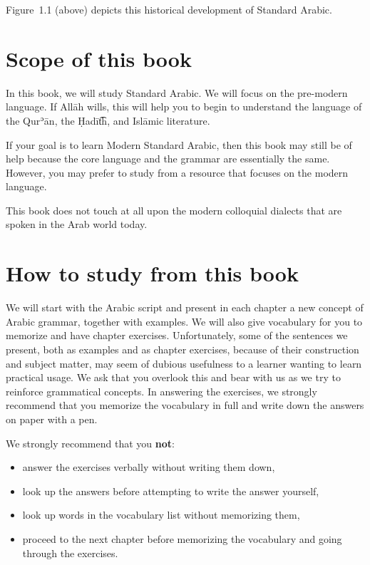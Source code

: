 \documentclass[
  10pt,
]{book}
\providecommand{\tightlist}{%
  \setlength{\itemsep}{0pt}\setlength{\parskip}{0pt}}
\begin{document}
Figure~1.1 (above) depicts this historical development of Standard Arabic.

\section{Scope of this book}\label{scope-of-this-book}

In this book, we will study Standard Arabic. We will focus on the pre-modern language. If Allāh wills, this will help you to begin to understand the language of the Qurʾān, the Ḥadīt͡h, and Islāmic literature.

If your goal is to learn Modern Standard Arabic, then this book may still be of help because the core language and the grammar are essentially the same. However, you may prefer to study from a resource that focuses on the modern language.

This book does not touch at all upon the modern colloquial dialects that are spoken in the Arab world today.

\section{How to study from this book}\label{how-to-study-from-this-book}

We will start with the Arabic script and present in each chapter a new concept of Arabic grammar, together with examples. We will also give vocabulary for you to memorize and have chapter exercises. Unfortunately, some of the sentences we present, both as examples and as chapter exercises, because of their construction and subject matter, may seem of dubious usefulness to a learner wanting to learn practical usage. We ask that you overlook this and bear with us as we try to reinforce grammatical concepts. In answering the exercises, we strongly recommend that you memorize the vocabulary in full and write down the answers on paper with a pen.

We strongly recommend that you \textbf{not}:

\begin{itemize}
\tightlist
\item
  answer the exercises verbally without writing them down,
\item
  look up the answers before attempting to write the answer yourself,
\item
  look up words in the vocabulary list without memorizing them,
\item
  proceed to the next chapter before memorizing the vocabulary and going through the exercises.
\end{itemize}
\end{document}
